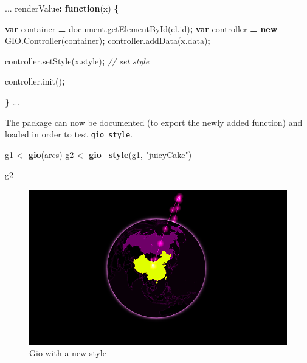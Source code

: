 \documentclass[
]{krantz}
\makeatletter
\newenvironment{Shaded}{\begin{snugshade}}{\end{snugshade}}
\newcommand{\AttributeTok}[1]{\textcolor[rgb]{0.61,0.61,0.61}{#1}}
\newcommand{\CommentTok}[1]{\textcolor[rgb]{0.37,0.37,0.37}{\textit{#1}}}
\newcommand{\KeywordTok}[1]{\textcolor[rgb]{0.27,0.27,0.27}{\textbf{#1}}}
\newcommand{\NormalTok}[1]{#1}
\newcommand{\OperatorTok}[1]{\textcolor[rgb]{0.43,0.43,0.43}{\textbf{#1}}}
\newcommand{\StringTok}[1]{\textcolor[rgb]{0.5,0.5,0.5}{#1}}
\newcommand{\VariableTok}[1]{\textcolor[rgb]{0,0,0}{#1}}
\newenvironment{kframe}{%
\medskip{}
\setlength{\fboxsep}{.8em}
 \def\at@end@of@kframe{}%
 \ifinner\ifhmode%
  \def\at@end@of@kframe{\end{minipage}}%
  \begin{minipage}{\columnwidth}%
 \fi\fi%
 \def\FrameCommand##1{\hskip\@totalleftmargin \hskip-\fboxsep
 \colorbox{shadecolor}{##1}\hskip-\fboxsep
     \hskip-\linewidth \hskip-\@totalleftmargin \hskip\columnwidth}%
 \MakeFramed {\advance\hsize-\width
   \@totalleftmargin\z@ \linewidth\hsize
   \@setminipage}}%
 {\par\unskip\endMakeFramed%
 \at@end@of@kframe}
\renewenvironment{Shaded}{\begin{kframe}}{\end{kframe}}
\makeatother
\begin{document}
\begin{Shaded}
\begin{Highlighting}[]
\NormalTok{...}
\NormalTok{renderValue}\OperatorTok{:} \KeywordTok{function}\NormalTok{(x) }\OperatorTok{\{}

  \KeywordTok{var}\NormalTok{ container }\OperatorTok{=} \VariableTok{document}\NormalTok{.}\AttributeTok{getElementById}\NormalTok{(}\VariableTok{el}\NormalTok{.}\AttributeTok{id}\NormalTok{)}\OperatorTok{;}
  \KeywordTok{var}\NormalTok{ controller }\OperatorTok{=} \KeywordTok{new} \VariableTok{GIO}\NormalTok{.}\AttributeTok{Controller}\NormalTok{(container)}\OperatorTok{;}
  \VariableTok{controller}\NormalTok{.}\AttributeTok{addData}\NormalTok{(}\VariableTok{x}\NormalTok{.}\AttributeTok{data}\NormalTok{)}\OperatorTok{;} 

  \VariableTok{controller}\NormalTok{.}\AttributeTok{setStyle}\NormalTok{(}\VariableTok{x}\NormalTok{.}\AttributeTok{style}\NormalTok{)}\OperatorTok{;} \CommentTok{// set style}

  \VariableTok{controller}\NormalTok{.}\AttributeTok{init}\NormalTok{()}\OperatorTok{;}

\OperatorTok{\}}
\NormalTok{...}
\end{Highlighting}
\end{Shaded}

The package can now be documented (to export the newly added function) and loaded in order to test \texttt{gio\_style}.

\begin{Shaded}
\begin{Highlighting}[]
\NormalTok{g1 <{-}}\StringTok{ }\KeywordTok{gio}\NormalTok{(arcs)}
\NormalTok{g2 <{-}}\StringTok{ }\KeywordTok{gio\_style}\NormalTok{(g1, }\StringTok{"juicyCake"}\NormalTok{)}

\NormalTok{g2}
\end{Highlighting}
\end{Shaded}

\begin{figure}
\centering
\includegraphics{images/gio-style.png}
\caption{Gio with a new style}
\end{figure}
\end{document}
